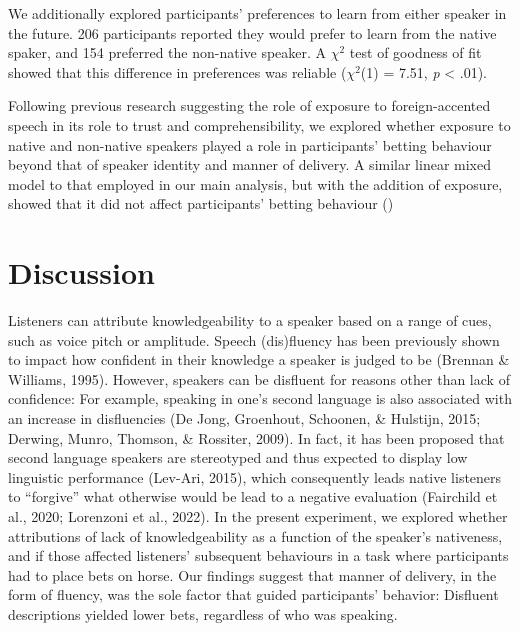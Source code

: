 \documentclass[
  man,floatsintext]{apa7}
\begin{document}
We additionally explored participants' preferences to learn from either speaker in the future. 206 participants reported they would prefer to learn from the native spaker, and 154 preferred the non-native speaker. A \(\chi^2\) test of goodness of fit showed that this difference in preferences was reliable (\(\chi^2\)(1) = 7.51, \emph{p} \textless{} .01).

Following previous research suggesting the role of exposure to foreign-accented speech in its role to trust and comprehensibility, we explored whether exposure to native and non-native speakers played a role in participants' betting behaviour beyond that of speaker identity and manner of delivery. A similar linear mixed model to that employed in our main analysis, but with the addition of exposure, showed that it did not affect participants' betting behaviour ()

\hypertarget{discussion}{%
\section{Discussion}\label{discussion}}

Listeners can attribute knowledgeability to a speaker based on a range of cues, such as voice pitch or amplitude. Speech (dis)fluency has been previously shown to impact how confident in their knowledge a speaker is judged to be (Brennan \& Williams, 1995). However, speakers can be disfluent for reasons other than lack of confidence: For example, speaking in one's second language is also associated with an increase in disfluencies (De Jong, Groenhout, Schoonen, \& Hulstijn, 2015; Derwing, Munro, Thomson, \& Rossiter, 2009). In fact, it has been proposed that second language speakers are stereotyped and thus expected to display low linguistic performance (Lev-Ari, 2015), which consequently leads native listeners to ``forgive'' what otherwise would be lead to a negative evaluation (Fairchild et al., 2020; Lorenzoni et al., 2022). In the present experiment, we explored whether attributions of lack of knowledgeability as a function of the speaker's nativeness, and if those affected listeners' subsequent behaviours in a task where participants had to place bets on horse. Our findings suggest that manner of delivery, in the form of fluency, was the sole factor that guided participants' behavior: Disfluent descriptions yielded lower bets, regardless of who was speaking.
\end{document}
